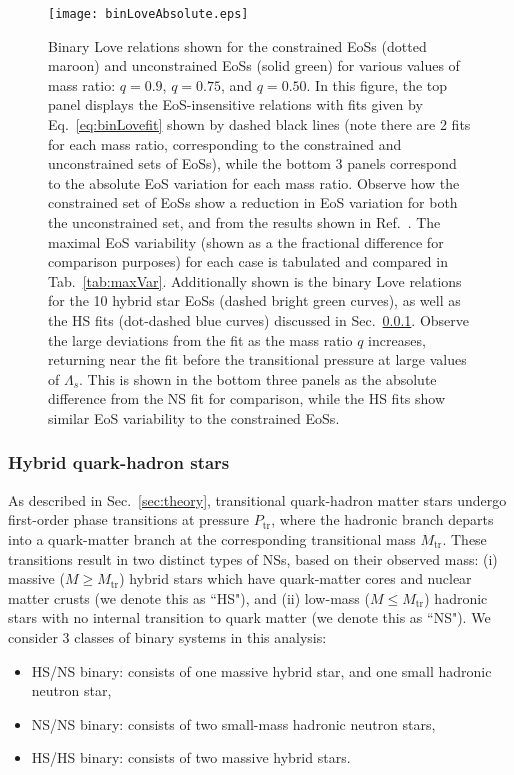 \documentclass[prd,twocolumn,nofootinbib,superscriptaddress,amsmath,amssymb]{revtex4-1}
\begin{document}
\begin{figure}
\begin{center} 
\texttt{[image: binLoveAbsolute.eps]}%
\end{center}
\caption{
Binary Love relations shown for the constrained EoSs (dotted maroon) and unconstrained EoSs (solid green) for various values of mass ratio: $q=0.9$, $q=0.75$, and $q=0.50$.
In this figure, the top panel displays the EoS-insensitive relations with fits given by Eq.~\ref{eq:binLovefit} shown by dashed black lines (note there are 2 fits for each mass ratio, corresponding to the constrained and unconstrained sets of EoSs), while the bottom 3 panels correspond to the absolute EoS variation for each mass ratio.
Observe how the constrained set of EoSs show a reduction in EoS variation for both the unconstrained set, and from the results shown in Ref.~\cite{Yagi:binLove}.
The maximal EoS variability (shown as a the fractional difference for comparison purposes) for each case is tabulated and compared in Tab.~\ref{tab:maxVar}.
Additionally shown is the binary Love relations for the 10 hybrid star EoSs (dashed bright green curves), as well as the HS fits (dot-dashed blue curves) discussed in Sec.~\ref{sec:binLove-hybrid}.
Observe the large deviations from the fit as the mass ratio $q$ increases, returning near the fit before the transitional pressure at large values of $\Lambda_s$.
This is shown in the bottom three panels as the absolute difference from the NS fit for comparison, while the HS fits show similar EoS variability to the constrained EoSs.
}
\label{fig:binLove}
\end{figure} 

\subsubsection{Hybrid quark-hadron stars}\label{sec:binLove-hybrid}
As described in Sec.~\ref{sec:theory}, transitional quark-hadron matter stars undergo first-order phase transitions at pressure $P_{\text{tr}}$, where the hadronic branch departs into a quark-matter branch at the corresponding transitional mass $M_{\text{tr}}$.
These transitions result in two distinct types of NSs, based on their observed mass: (i) massive ($M \geq M_{\text{tr}}$) hybrid stars which have quark-matter cores and nuclear matter crusts (we denote this as ``HS"), and (ii) low-mass ($M \leq M_{\text{tr}}$) hadronic stars with no internal transition to quark matter (we denote this as ``NS").
We consider 3 classes of binary systems in this analysis:
\begin{itemize}
\item HS/NS binary: consists of one massive hybrid star, and one small hadronic neutron star,
\item NS/NS binary: consists of two small-mass hadronic neutron stars,
\item HS/HS binary: consists of two massive hybrid stars.
\end{itemize}
\end{document}
